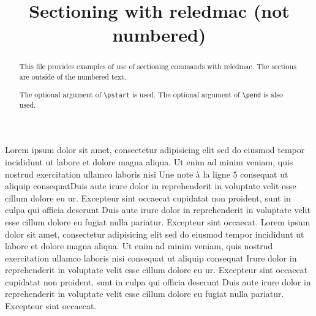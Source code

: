\documentclass{scrartcl}
\begin{document}
\begin{english}
\date{}
\title{Sectioning with reledmac (not numbered)}
\maketitle
\begin{abstract}
This file provides examples of use of sectioning commands with reledmac.
The sections are outside of the numbered text. 

The optional argument of \verb+\pstart+ is used. The optional argument of \verb+\pend+ is also used.
\end{abstract}
\end{english}

\beginnumbering
{}
Lorem ipsum dolor sit amet, consectetur adipisicing elit
sed do eiusmod tempor incididunt ut labore et dolore
magna aliqua. Ut enim ad minim veniam, quis nostrud
exercitation ullamco laboris nisi
Une note à la ligne 5 consequat ut aliquip consequat\pend[\vskip 2ex]
Duis aute irure dolor in reprehenderit
in voluptate velit esse cillum dolore eu ur. Excepteur sint occaecat
cupidatat non proident, sunt in culpa qui officia deserunt
Duis aute irure dolor in reprehenderit
in voluptate velit esse cillum dolore eu fugiat nulla
pariatur. Excepteur sint occaecat.
\pend[]
Lorem ipsum dolor sit amet, consectetur adipisicing elit
sed do eiusmod tempor incididunt ut labore et dolore
magna aliqua. Ut enim ad minim veniam, quis nostrud
exercitation ullamco laboris nisi
 consequat ut aliquip consequat
Irure dolor in reprehenderit
in voluptate velit esse cillum dolore eu ur. Excepteur sint occaecat
cupidatat non proident, sunt in culpa qui officia deserunt
Duis aute irure dolor in reprehenderit
in voluptate velit esse cillum dolore eu fugiat nulla
pariatur. Excepteur sint occaecat.
\pend
\endnumbering
\end{document}
